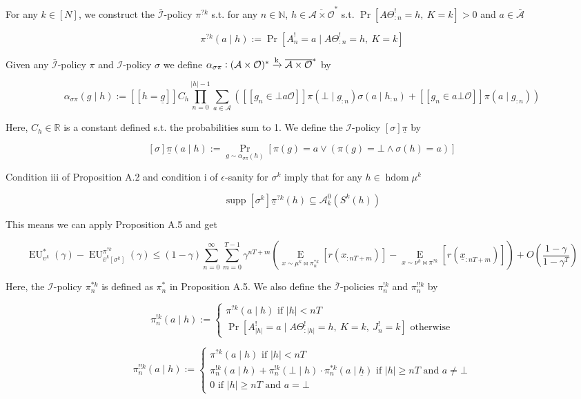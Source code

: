 \documentclass[a4paper]{article}
\DeclareMathOperator{\Supp}{supp}
\newcommand{\E}[1]{\underset{#1}{\operatorname{E}}}
\newcommand{\Nats}{\mathbb{N}}
\newcommand{\Reals}{\mathbb{R}}
\newcommand{\Abs}[1]{\left\vert #1 \right\vert}
\newcommand{\M}{\xrightarrow{\textnormal{k}}}
\newcommand{\Ob}{\mathcal{O}}
\newcommand{\A}{\mathcal{A}}
\newcommand{\In}{\mathcal{I}}
\newcommand{\FH}{(\A \times \Ob)^*}
\newcommand{\Ada}{\bar{\A}}
\newcommand{\Adi}{{\bar{\In}}}
\newcommand{\Adao}{\overline{\A \times \Ob}}
\newcommand{\Adfh}{\Adao^*}
\DeclareMathOperator{\HD}{hdom}
\newcommand{\EU}{\operatorname{EU}}
\newcommand{\J}{J}
\begin{document}
For any $k \in [N]$, we construct the $\Adi$-policy $\pi^{?k}$ s.t. for any $n \in \Nats$, $h \in \Adfh$ s.t. $\Pr\left[A\Theta^!_{:n}=h,\ K = k\right] > 0$ and $a \in \Ada$

$$\pi^{?k}(a \mid h):=\Pr\left[A^!_n = a \mid A\Theta^!_{:n} = h,\ K = k\right]$$

Given any $\Adi$-policy $\pi$ and $\In$-policy $\sigma$ we define $\alpha_{\sigma\pi}: \FH \M \Adfh$ by

$$\alpha_{\sigma\pi} (g \mid h) := [[h = \underline{g}]]C_h\prod_{n = 0}^{\Abs{h}-1} \sum_{a \in \A}\left([[g_n \in \bot a\Ob]] \pi\left(\bot \mid g_{:n}\right)\sigma\left(a \mid h_{:n}\right)+[[g_n \in a\bot\Ob]]\pi\left(a \mid g_{:n}\right)\right)$$

Here, $C_h \in \Reals$ is a constant defined s.t. the probabilities sum to 1. We define the $\In$-policy $\left[\sigma\right]\underline{\pi}$ by

$$\left[\sigma\right]\underline{\pi}(a \mid h):=\Pr_{g \sim \alpha_{\sigma\pi}(h)}\left[\pi\left(g\right)=a \lor \left(\pi\left(g\right)=\bot \land \sigma(h)=a\right)\right]$$

Condition iii of Proposition A.2 and condition i of $\epsilon$-sanity for $\sigma^k$ imply that for any $h \in \HD{\mu^k}$

$$\Supp{\left[\sigma^k\right]\underline{\pi}^{?k}(h)} \subseteq \A^0_k\left(S^k\left(h\right)\right)$$

This means we can apply Proposition A.5 and get

$$\EU^*_{\upsilon^k}(\gamma)-\EU^{\pi^{?k}}_{\bar{\upsilon}^k[\sigma^k]}(\gamma) \leq (1-\gamma)\sum_{n=0}^\infty \sum_{m=0}^{T-1} \gamma^{nT+m}\left(\E{x\sim\mu^k\bowtie\pi^{*k}_n}\left[r\left(x_{:nT+m}\right)\right]-\E{x\sim\nu^k\bowtie\pi^{?k}}\left[r\left(\underline{x}_{:nT+m}\right)\right]\right) + O\left(\frac{1-\gamma}{1-\gamma^T}\right)$$

Here, the $\In$-policy $\pi^{*k}_n$ is defined as $\pi^*_n$ in Proposition A.5. We also define the $\Adi$-policies $\pi^{!k}_n$ and $\pi^{!!k}_n$ by

$$\pi^{!k}_n(a \mid h):=\begin{cases} \pi^{?k}(a \mid h) \text{ if } \Abs{h} < nT \\ \Pr\left[A^!_{\Abs{h}} = a \mid A\Theta^!_{:{\Abs{h}}} = h,\ K = k,\ \J^!_n = k\right] \text{ otherwise} \end{cases}$$

$$\pi^{!!k}_n(a \mid h):=\begin{cases} \pi^{?k}(a \mid h) \text{ if } \Abs{h} < nT \\ \pi^{!k}_n(a \mid h) + \pi^{!k}_n(\bot \mid h) \cdot \pi^{*k}_n\left(a \mid \underline{h}\right) \text{ if } \Abs{h} \geq nT \text{ and } a \ne \bot \\ 0 \text{ if } \Abs{h} \geq nT \text{ and } a = \bot \end{cases}$$
\end{document}
